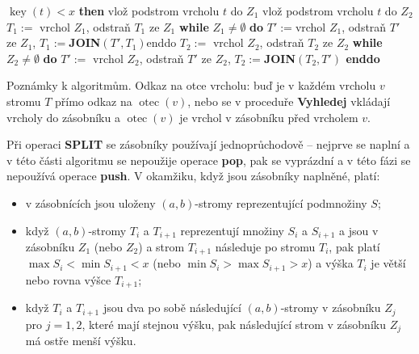 \documentclass[a4paper,12pt]{article}
\DeclareMathOperator*{\otec}{otec}
\DeclareMathOperator*{\key}{key}
\begin{document}
\phantom{---}{\bf if} $\key(t)<x$ {\bf then}\newline 
\phantom{------}vlož podstrom vrcholu $t$ do $Z_1$\newline 
\phantom{---}{\bf else}\newline 
\phantom{------}vlož podstrom vrcholu $t$ do $Z_2$\newline 
\phantom{---}{\bf endif\newline 
endif}\newline 
$T_1:=\text{ vrchol }Z_1$, odstraň $T_1$ ze $Z_1$\newline 
{\bf while} $Z_1\ne\emptyset$ {\bf do}\newline 
\phantom{---}$T':=$vrchol $Z_1$, odstraň $T'$ ze $Z_1$, $T_1:=${\bf JOIN}$(T',T_1)$\newline enddo\newline 
$T_2:=\text{ vrchol }Z_2$, odstraň $T_2$ ze $Z_2$\newline 
{\bf while} $Z_2\ne\emptyset$ {\bf do}\newline 
$T':=\text{ vrchol }Z_2$, odstraň $T'$ ze $Z_2$, $T_2:=${\bf JOIN$(T_2,T')$\newline 
enddo}

Poznámky k algoritmům. \newline 
Odkaz na otce vrcholu: buď je v každém vrcholu $v$ 
stromu $T$ přímo odkaz na $\otec(v)$, nebo se v proceduře 
{\bf Vyhledej} vkláda\-jí vrcholy do zásobníku a $\otec
(v)$ 
je vrchol v zásobníku před vrcholem $v$.

Při operaci {\bf SPLIT} se zásobníky používají 
jednoprůchodově -- nejprve se naplní a v této části 
algoritmu se nepoužije operace {\bf pop}, pak se vyprázdní a v této 
fázi se nepoužívá operace {\bf push}. V okamžiku, když jsou 
zásobníky naplněné, platí:
\begin{itemize}
\item
v zásobnících jsou uloženy $(a,b)$-stromy reprezentující 
podmnožiny $S$;
\item 
když $(a,b)$-stromy $T_i$ a $T_{i+1}$ reprezentují množiny $S_
i$ a $S_{i+1}$ a jsou v zá\-sobníku $Z_1$ (nebo $Z_2$) a strom $T_{i+1}$ následuje 
po stromu $T_{i}$, pak platí $\max S_i<\min S_{i+1}<x$ (nebo 
$\min S_i>\max S_{i+1}>x$) a výška $T_i$ je větší nebo 
rovna výšce $T_{i+1}$;
\item
když $T_i$ a $T_{i+1}$ jsou dva po sobě následující $
(a,b)$-stromy v 
zásobníku $Z_j$ pro $j=1,2$, které mají stejnou výšku, pak 
následující strom v zásobníku $Z_j$ má ostře menší výšku.
\end{itemize}
\end{document}
